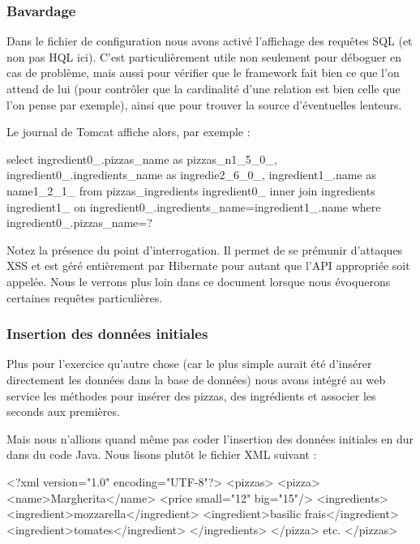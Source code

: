 \subsubsection{Bavardage}

Dans le fichier de configuration nous avons activé l'affichage des requêtes SQL (et non pas HQL ici). 
C'est particulièrement utile non seulement pour déboguer en cas de problème, mais
aussi pour vérifier que le framework fait bien ce que l'on attend de lui (pour contrôler que la cardinalité 
d'une relation est bien celle que l'on pense par exemple), ainsi que pour trouver la source
d'éventuelles lenteurs.

Le journal de Tomcat affiche alors, par exemple :

\begin{sqlcode}
    select
        ingredient0_.pizzas_name as pizzas_n1_5_0_,
        ingredient0_.ingredients_name as ingredie2_6_0_,
        ingredient1_.name as name1_2_1_ 
    from
        pizzas_ingredients ingredient0_ 
    inner join
        ingredients ingredient1_ 
            on ingredient0_.ingredients_name=ingredient1_.name 
    where
        ingredient0_.pizzas_name=?
\end{sqlcode}

Notez la présence du point d'interrogation. Il permet de se prémunir d'attaques XSS et est géré entièrement
par Hibernate pour autant que l'API appropriée soit appelée. Nous le verrons plus loin dans ce document  lorsque
nous évoquerons certaines requêtes particulières.

\subsubsection{Insertion des données initiales}

Plus pour l'exercice qu'autre chose (car le plus simple aurait été d'insérer directement les données
dans la base de données) nous avons intégré au web service les méthodes pour insérer des pizzas, des ingrédients
et associer les seconds aux premières.

Mais nous n'allions quand même pas coder l'insertion des données initiales en dur dans du code Java.
Nous lisons plutôt le fichier XML suivant :

\begin{xmlcode}
<?xml version="1.0" encoding="UTF-8"?>
<pizzas>
    <pizza>
        <name>Margherita</name>
        <price small="12" big="15"/>
        <ingredients>
            <ingredient>mozzarella</ingredient>
            <ingredient>basilic frais</ingredient>
            <ingredient>tomates</ingredient>
        </ingredients>
    </pizza>
    etc.
</pizzas>
\end{xmlcode}

